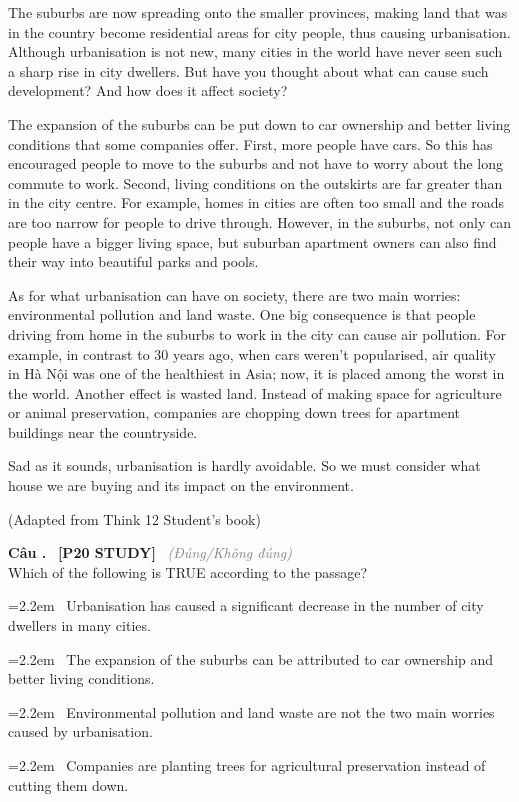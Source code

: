 \documentclass[12pt,a4paper,twoside]{article}
\newcounter{qcounter}
\newcommand{\question}[2][]{%
    \stepcounter{qcounter}%
    \par\vspace{6pt}%
    \noindent\textcolor{primaryBlue}{\textbf{Câu \theqcounter.}}~%
    \textcolor{secondaryBlue}{\small\textbf{[P20 STUDY]}}~%
    \if\relax\detokenize{#1}\relax\else\textcolor{gray}{\small\textit{(#1)}}~\fi\\[1pt]
    \noindent #2%
}
\newcommand{\choiceitem}[2]{%
    \tikz[baseline=-0.5ex]{%
        \node[draw=primaryBlue, circle, minimum size=1.5em, inner sep=0pt, thick] {\textbf{#1}};%
    }~#2%
}
\newenvironment{readingpassage}[1][]{%
    \begin{tcolorbox}[enhanced, colback=grayLight, colframe=secondaryBlue,
        coltitle=textDark, fonttitle=\bfseries, title={#1},
        rounded corners, arc=3mm, boxrule=1pt,
        left=15pt, right=15pt, top=10pt, bottom=10pt,
        breakable, before skip=10pt, after skip=10pt, drop fuzzy shadow]
    \setstretch{1.3}
}{\end{tcolorbox}}
\begin{document}
\begin{readingpassage}[]
The suburbs are now spreading onto the smaller provinces, making land that was in the country become residential areas for city people, thus causing urbanisation. Although urbanisation is not new, many cities in the world have never seen such a sharp rise in city dwellers. But have you thought about what can cause such development? And how does it affect society?

The expansion of the suburbs can be put down to car ownership and better living conditions that some companies offer. First, more people have cars. So this has encouraged people to move to the suburbs and not have to worry about the long commute to work. Second, living conditions on the outskirts are far greater than in the city centre. For example, homes in cities are often too small and the roads are too narrow for people to drive through. However, in the suburbs, not only can people have a bigger living space, but suburban apartment owners can also find their way into beautiful parks and pools.

As for what urbanisation can have on society, there are two main worries: environmental pollution and land waste. One big consequence is that people driving from home in the suburbs to work in the city can cause air pollution. For example, in contrast to 30 years ago, when cars weren't popularised, air quality in Hà Nội was one of the healthiest in Asia; now, it is placed among the worst in the world. Another effect is wasted land. Instead of making space for agriculture or animal preservation, companies are chopping down trees for apartment buildings near the countryside.

Sad as it sounds, urbanisation is hardly avoidable. So we must consider what house we are buying and its impact on the environment.

(Adapted from Think 12 Student’s book)
\end{readingpassage}

\question[Đúng/Không đúng]{Which of the following is TRUE according to the passage?}

\par\vspace{4pt}
\noindent\hangindent=2.2em\choiceitem{A}{Urbanisation has caused a significant decrease in the number of city dwellers in many cities.}\par\vspace{4pt}
\noindent\hangindent=2.2em\choiceitem{B}{The expansion of the suburbs can be attributed to car ownership and better living conditions.}\par\vspace{4pt}
\noindent\hangindent=2.2em\choiceitem{C}{Environmental pollution and land waste are not the two main worries caused by urbanisation.}\par\vspace{4pt}
\noindent\hangindent=2.2em\choiceitem{D}{Companies are planting trees for agricultural preservation instead of cutting them down.}\par\vspace{4pt}
\end{document}
